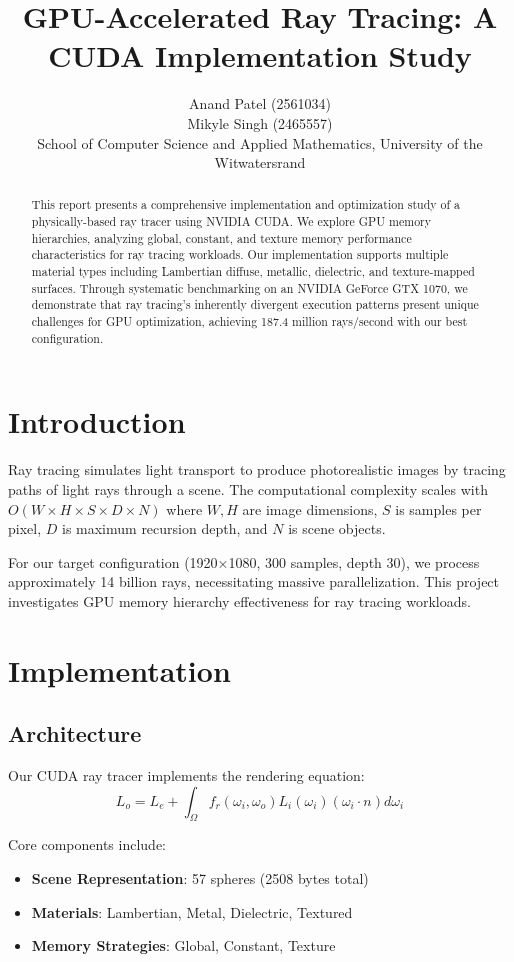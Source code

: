 \documentclass[conference]{IEEEtran}
\title{GPU-Accelerated Ray Tracing: A CUDA Implementation Study}
\author{Anand Patel (2561034) \\Mikyle Singh (2465557) \\ School of Computer Science and Applied Mathematics, University of the Witwatersrand}
\begin{document}
\maketitle

\begin{abstract}
This report presents a comprehensive implementation and optimization study of a physically-based ray tracer using NVIDIA CUDA. We explore GPU memory hierarchies, analyzing global, constant, and texture memory performance characteristics for ray tracing workloads. Our implementation supports multiple material types including Lambertian diffuse, metallic, dielectric, and texture-mapped surfaces. Through systematic benchmarking on an NVIDIA GeForce GTX 1070, we demonstrate that ray tracing's inherently divergent execution patterns present unique challenges for GPU optimization, achieving 187.4 million rays/second with our best configuration.
\end{abstract}

\section{Introduction}
Ray tracing simulates light transport to produce photorealistic images by tracing paths of light rays through a scene. The computational complexity scales with $O(W \times H \times S \times D \times N)$ where $W,H$ are image dimensions, $S$ is samples per pixel, $D$ is maximum recursion depth, and $N$ is scene objects.

For our target configuration (1920×1080, 300 samples, depth 30), we process approximately 14 billion rays, necessitating massive parallelization. This project investigates GPU memory hierarchy effectiveness for ray tracing workloads.

\section{Implementation}

\subsection{Architecture}
Our CUDA ray tracer implements the rendering equation:
\begin{equation}
L_o = L_e + \int_{\Omega} f_r(\omega_i, \omega_o) L_i(\omega_i) (\omega_i \cdot n) d\omega_i
\end{equation}

Core components include:
\begin{itemize}
    \item \textbf{Scene Representation}: 57 spheres (2508 bytes total)
    \item \textbf{Materials}: Lambertian, Metal, Dielectric, Textured
    \item \textbf{Memory Strategies}: Global, Constant, Texture
\end{itemize}
\end{document}
